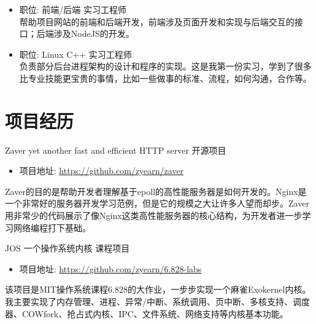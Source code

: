 \documentclass[11pt,a4paper]{moderncv}
\begin{document}
{
\begin{itemize}
\item 职位: 前端/后端 实习工程师\\
帮助项目网站的前端和后端开发，前端涉及页面开发和实现与后端交互的接口；后端涉及NodeJS的开发。
\end{itemize}
}

{
\begin{itemize}
\item 职位: Linux C++ 实习工程师\\
负责部分后台进程架构的设计和程序的实现。这是我第一份实习，学到了很多比专业技能更宝贵的事情，比如一些做事的标准、流程，如何沟通，合作等。
\end{itemize}
}


\section{项目经历}
{Zaver}
{yet another fast and efficient HTTP server}
{开源项目}
{}
{
\begin{itemize}
    \item 项目地址: \url{https://github.com/zyearn/zaver}
\end{itemize}
Zaver的目的是帮助开发者理解基于epoll的高性能服务器是如何开发的。Nginx是一个非常好的服务器开发学习范例，但是它的规模之大让许多人望而却步。Zaver用非常少的代码展示了像Nginx这类高性能服务器的核心结构，为开发者进一步学习网络编程打下基础。
}
\vspace*{0.2\baselineskip}

{JOS}
{一个操作系统内核}
{课程项目}
{}
{
\begin{itemize}
    \item 项目地址: \url{https://github.com/zyearn/6.828-labs}
\end{itemize}
该项目是MIT操作系统课程6.828的大作业，一步步实现一个麻雀Exokernel内核。我主要实现了内存管理、进程、异常/中断、系统调用、页中断、多核支持、调度器、COWfork、抢占式内核、IPC、文件系统、网络支持等内核基本功能。
}
\vspace*{0.2\baselineskip}
\end{document}
